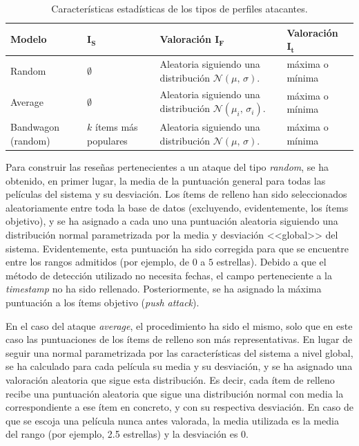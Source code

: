 \begin{table}
\begin{centering}
	\begin{tabular}{@{}p{5em} p{5em} p{11em} p{9em}@{}}
		\toprule
		\textbf{Modelo} & $\mathbf{I_S}$ & \textbf{Valoración} $\mathbf{I_F}$ &  \textbf{Valoración} $\mathbf{I_t}$\\ 
		\midrule
		Random & $\emptyset$ & Aleatoria siguiendo una distribución $\mathcal{N}(\mu,\,\sigma)$. & máxima o mínima \\
		Average & $\emptyset$ & Aleatoria siguiendo una distribución $\mathcal{N}(\mu_i,\,\sigma_i)$. & máxima o mínima\\
		Bandwagon (random) & $k$ ítems más populares & Aleatoria siguiendo una distribución $\mathcal{N}(\mu,\,\sigma)$. & máxima o mínima\\
		\bottomrule
	\end{tabular}
	\caption[Experimentación: características de ataques a detectar]{Características estadísticas de los tipos de perfiles atacantes.}
	\label{ataques_coforest}	
\end{centering}
\end{table}

Para construir las reseñas pertenecientes a un ataque del tipo \textit{random}, se ha obtenido, en primer lugar, la media de la puntuación general para todas las películas del sistema y su desviación. Los ítems de relleno han sido seleccionados aleatoriamente entre toda la base de datos (excluyendo, evidentemente, los ítems objetivo), y se ha asignado a cada uno una puntuación aleatoria siguiendo una distribución normal parametrizada por la media y desviación <<global>> del sistema. Evidentemente, esta puntuación ha sido corregida para que se encuentre entre los rangos admitidos (por ejemplo, de $0$ a $5$ estrellas). Debido a que el método de detección utilizado no necesita fechas, el campo perteneciente a la \textit{timestamp} no ha sido rellenado. Posteriormente, se ha asignado la máxima puntuación a los ítems objetivo (\textit{push attack}).

En el caso del ataque \textit{average}, el procedimiento ha sido el mismo, solo que en este caso las puntuaciones de los ítems de relleno son más representativas. En lugar de seguir una normal parametrizada por las características del sistema a nivel global, se ha calculado para cada película su media y su desviación, y se ha asignado una valoración aleatoria que sigue esta distribución. Es decir, cada ítem de relleno recibe una puntuación aleatoria que sigue una distribución normal con media la correspondiente a ese ítem en concreto, y con su respectiva desviación. En caso de que se escoja una película nunca antes valorada, la media utilizada es la media del rango (por ejemplo, 2.5 estrellas) y la desviación es $0$.


